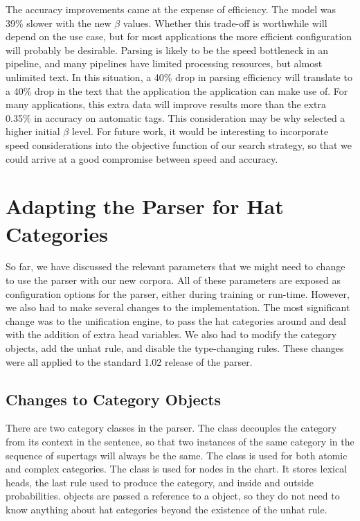 The accuracy improvements came at the expense of efficiency. The \hybrid model
was 39\% slower with the new $\beta$ values. Whether this trade-off is
worthwhile will depend on the use case, but for most applications the more
efficient configuration will probably be desirable. Parsing is likely to be the
speed bottleneck in an \nlp pipeline, and many \nlp pipelines have limited
processing resources, but almost unlimited text. In this situation, a 40\% drop
in parsing efficiency will translate to a 40\% drop in the text that the
application the application can make use of. For many applications, this extra
data will improve results more than the extra 0.35\% in accuracy on automatic
\pos tags. This consideration may be why \citet{clark:cl07} selected a higher
initial $\beta$ level. For future work, it would be interesting to incorporate
speed considerations into the objective function of our search strategy, so that
we could arrive at a good compromise between speed and accuracy.


\section{Adapting the \candc Parser for Hat Categories}
\label{sec:implementation}

So far, we have discussed the relevant parameters that we might need to change
to use the \candc parser with our new corpora. All of these parameters are
exposed as configuration options for the parser, either during training or
run-time. However, we also had to make several changes to the implementation.
The most significant change was to the unification engine, to pass the hat
categories around and deal with the addition of extra head variables. We also
had to modify the category objects, add the unhat rule, and disable the
type-changing rules. These changes were all applied to the standard 1.02
release of the parser.

\subsection{Changes to Category Objects}



There are two category classes in the \candc parser. The  class
decouples the \ccg category from its context in the sentence, so that two
instances of the same category in the sequence of supertags will always be the
same. The  class is used for both atomic and complex categories.
The  class is used for nodes in the chart. It stores lexical
heads, the last rule used to produce the category, and inside and outside
probabilities.  objects are passed a reference to a
 object, so they do not need to know anything about hat categories
beyond the existence of the unhat rule.

